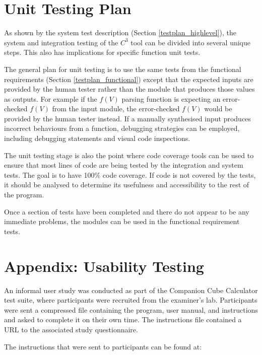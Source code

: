\documentclass[12pt, titlepage]{article}
\newcommand{\progname}{Companion Cube Calculator} %
\newcommand{\prognameAbbrv}{$C^{3}$}
\begin{document}
\section{Unit Testing Plan}
		
As shown by the system test description (Section \ref{testplan_highlevel}), the 
system and integration testing of the \prognameAbbrv{} tool can be divided into 
several unique steps. This also has implications for specific function unit 
tests.

The general plan for unit testing is to use the same tests from the functional 
requirements (Section \ref{testplan_functional}) except that the expected 
inputs are provided by the human tester rather than the module that produces 
those values as outputs. For example if the $f(V)$ parsing function is 
expecting an error-checked $f(V)$ from the input module, the error-checked 
$f(V)$ would be provided by the human tester instead. If a manually synthesised 
input produces incorrect behaviours from a function, debugging strategies can 
be employed, including debugging statements and visual code inspections.

The unit testing stage is also the point where code coverage tools can be used 
to ensure that most lines of code are being tested by the integration and 
system tests. The goal is to have 100\% code coverage. If code is not covered 
by the tests, it should be analysed to determine its usefulness and 
accessibility to the rest of the program. 

Once a section of tests have been completed and there do not appear to be any 
immediate problems, the modules can be used in the functional requirement tests.

%

%

\newpage

\section{Appendix: Usability Testing}
\label{appendix_userstudy}
An informal user study was conducted as part of the \progname{} test suite, 
where participants were recruited from the examiner's lab. Participants were 
sent a compressed file containing the program, user manual, and instructions 
and asked to complete it on their own time. The instructions file contained a 
URL to the associated study questionnaire. 

The instructions that were sent to participants can be found at: 
\end{document}
